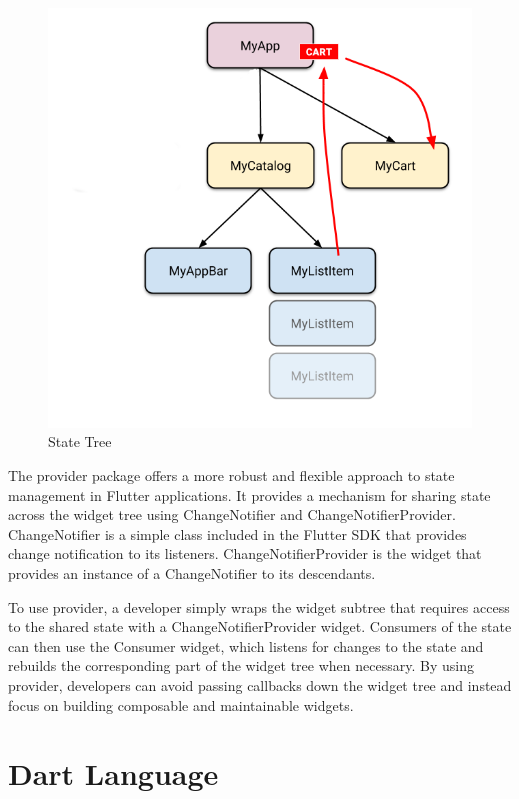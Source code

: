\documentclass[conference]{IEEEtran}
\begin{document}
\begin{figure}[ht]
	\centerline{\includegraphics[width=\linewidth]{figures/state_management_tree}}
	\caption{State Tree}
	\label{fig:state_tree}
\end{figure}


The provider package offers a more robust and flexible approach to state management in Flutter applications. It provides a mechanism for sharing state across the widget tree using ChangeNotifier and ChangeNotifierProvider. ChangeNotifier is a simple class included in the Flutter SDK that provides change notification to its listeners. ChangeNotifierProvider is the widget that provides an instance of a ChangeNotifier to its descendants.

To use provider, a developer simply wraps the widget subtree that requires access to the shared state with a ChangeNotifierProvider widget. Consumers of the state can then use the Consumer widget, which listens for changes to the state and rebuilds the corresponding part of the widget tree when necessary. By using provider, developers can avoid passing callbacks down the widget tree and instead focus on building composable and maintainable widgets.



\section{Dart Language}
\end{document}

